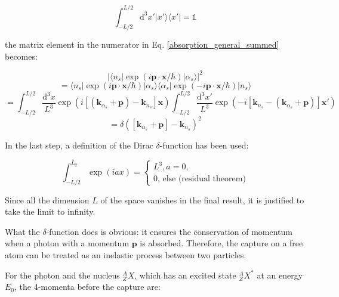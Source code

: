 \documentclass{article}
\begin{document}
\begin{equation}
	\int_{-L/2}^{L/2} \mathrm{d}^3 x' \left| x' \rangle \langle x' \right| = \mathbb{1}
\end{equation}

the matrix element in the numerator in Eq. \ref{absorption_general_summed} becomes:

\begin{equation}
	\label{plane_wave_delta}
	\left| \langle n_s | \exp{\left( i \mathbf{p} \cdot \mathbf{x} / \hbar \right)} | \alpha_s \rangle \right|^2 
\end{equation}
\begin{equation*}
	= \langle n_s | \exp{\left( i \mathbf{p} \cdot \mathbf{x} / \hbar \right)} | \alpha_s \rangle \langle \alpha_s | \exp{\left( -i \mathbf{p} \cdot \mathbf{x} / \hbar \right)} | n_s \rangle
\end{equation*}
\begin{equation*}
	= \int_{-L/2}^{L/2} \frac{\mathrm{d}^3 x}{L^3} \exp{ \left( i \left[ \left( \mathbf{k}_{\alpha_s} + \mathbf{p} \right) - \mathbf{k}_{n_s} \right] \mathbf{x} \right) } \int_{-L/2}^{L/2}\frac{\mathrm{d}^3 x'}{L^3} \exp{ \left( - i \left[ \mathbf{k}_{n_s} - \left( \mathbf{k}_{\alpha_s} + \mathbf{p} \right) \right] \mathbf{x}' \right) }
\end{equation*}
\begin{equation*}
	= \delta \left( \left[ \mathbf{k}_{\alpha_s} + \mathbf{p} \right] - \mathbf{k}_{n_s} \right)^2
\end{equation*}

In the last step, a definition of the Dirac $\delta$-function has been used:

\begin{equation}
	\int_{-L/2}^{L_2} \exp{ \left( i a x \right) } = 
	\begin{cases}
	L^3, a = 0,\\
	0 \text{, else (residual theorem)}
	\end{cases}
\end{equation}

Since all the dimension $L$ of the space vanishes in the final result, it is justified to take the limit to infinity.

What the $\delta$-function does is obvious: it ensures the conservation of momentum when a photon with a momentum $\mathbf{p}$ is absorbed. 
Therefore, the capture on a free atom can be treated as an inelastic process between two particles. 

For the photon and the nucleus $^A_ZX$, which has an excited state $^A_ZX^*$ at an energy $E_0$, the 4-momenta before the capture are:
\end{document}
